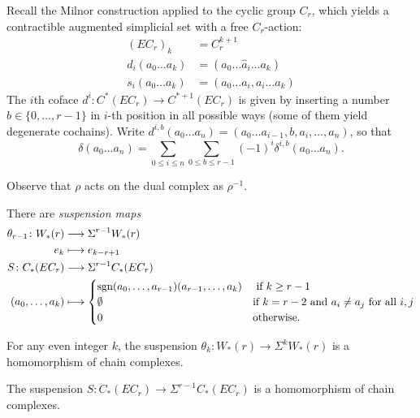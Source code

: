 Recall the Milnor construction applied to the cyclic group $C_r$, which yields a contractible augmented simplicial set with a free $C_r$-action:
\begin{align*}
	(EC_r)_k &= C_r^{k+1}\\
	d_i(a_0\ldots a_k) &= (a_0\ldots\hat{a}_i\ldots a_k) \\
	s_i(a_0\ldots a_k) &= (a_0\ldots a_i,a_i\ldots a_k)
\end{align*}
The $i$th coface $d^i\colon C^*(EC_r)\to C^{*+1}(EC_r)$ is given by inserting a number $b\in \{0,\ldots,r-1\}$ in $i$-th position in all possible ways (some of them yield degenerate cochains). Write $d^{i,b}(a_0\ldots a_n) = (a_0\ldots a_{i-1},b,a_i,\ldots, a_n)$, so that
\[\delta(a_0\ldots a_n) = \sum_{0\leq i\leq n}\sum_{0\leq b\leq r-1}(-1)^i \delta^{i,b}(a_0\ldots a_n).\]
\begin{warning} Observe that $\rho$ acts on the dual complex as $\rho^{-1}$.
\end{warning}
There are \emph{suspension maps}
\begin{align*}
	\theta_{r-1}\colon W_*(r) & \longrightarrow  \Sigma^{r-1}W_*(r) \\
	e_k & \longmapsto e_{k-r+1} \\
	S\colon  C_*(EC_r)&\longrightarrow \Sigma^{r-1}C_*(EC_r) \\
	(a_0,\ldots,a_k) & \longmapsto \begin{cases}
		{\operatorname*{sgn}(a_{0},\ldots,a_{r-1})} (a_{r-1},\ldots,a_{k}) & \text{ if $k\geq r-1$} \\
		\emptyset & \text{if $k = r-2$ and $a_i\neq a_j$ for all $i,j$} \\
		0 & \text{otherwise.}
	\end{cases}
\end{align*}
\begin{remark}
	For any even integer $k$, the suspension $\theta_{k}\colon W_*(r)\to \Sigma^{k}W_*(r)$ is a homomorphism of chain complexes.
\end{remark}
\begin{lemma}
	The suspension $S\colon C_*(EC_r)\to \Sigma^{r-1}C_*(EC_r)$ is a homomorphism of chain complexes.
\end{lemma}
